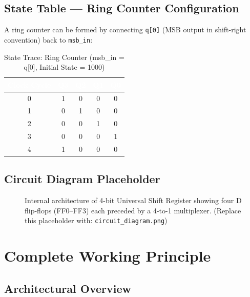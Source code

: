 \documentclass[12pt,a4paper]{report}
\newcommand{\signal}[1]{\texttt{\textcolor{codeblue}{#1}}}
\begin{document}
\section{State Table — Ring Counter Configuration}

A ring counter can be formed by connecting \signal{q[0]} (MSB output in shift-right convention) back to \signal{msb\_in}:

\begin{table}[H]
\centering
\caption{State Trace: Ring Counter (msb\_in = q[0], Initial State = 1000)}
\renewcommand{\arraystretch}{1.3}
\begin{tabular}{ccccc}
    \toprule
    \rowcolor{tableheader}
    \textcolor{white}{\textbf{Clock Cycle}} &
    \textcolor{white}{\textbf{Q3}} &
    \textcolor{white}{\textbf{Q2}} &
    \textcolor{white}{\textbf{Q1}} &
    \textcolor{white}{\textbf{Q0}} \\
    \midrule
    0 & 1 & 0 & 0 & 0 \\
    1 & 0 & 1 & 0 & 0 \\
    2 & 0 & 0 & 1 & 0 \\
    3 & 0 & 0 & 0 & 1 \\
    4 & 1 & 0 & 0 & 0 \\
    \bottomrule
\end{tabular}
\label{tab:ringcounter}
\end{table}

\section{Circuit Diagram Placeholder}

\begin{figure}[H]
    \centering
    \fbox{\rule{0pt}{8cm}\rule{14cm}{0pt}}
    \caption{Internal architecture of 4-bit Universal Shift Register showing four D flip-flops (FF0--FF3) each preceded by a 4-to-1 multiplexer. (Replace this placeholder with: \texttt{circuit\_diagram.png})}
    \label{fig:circuit}
\end{figure}

\chapter{Complete Working Principle}

\section{Architectural Overview}
\end{document}
